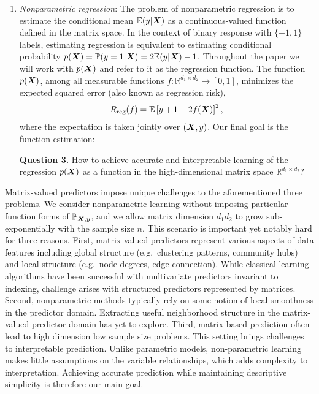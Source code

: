 \documentclass[12pt]{article}
\begin{document}
\begin{enumerate}[label={2.\arabic*},wide, labelwidth=!, labelindent=0pt]
{\bf Question 2.} How to simultaneously estimate the level set and identify important variables in the matrix-valued predictors $\mX$, for the goal of interpretable prediction?


\item {\it Nonparametric regression}: The problem of nonparametric regression is to estimate the conditional mean $\mathbb{E}(y|\bm X)$ as a continuous-valued function defined in the matrix space. In the context of binary response with $\{-1,1\}$ labels, estimating regression is equivalent to estimating conditional probability $p(\bm X)=\mathbb{P}(y=1|\bm X)=2\mathbb{E}(y|\bm X)-1$. Throughout the paper we will work with $p(\bm X)$ and refer to it as the regression function. The function $p(\bm X)$, among all measurable functions $f\colon \mathbb{R}^{d_1\times d_2}\to[0,1]$, minimizes the expected squared error (also known as regression risk),
\begin{equation}\label{eq:regression}
R_{\text{reg}}(f)=\mathbb{E}\left[y+1-2f(\bm X)\right]^2,
\end{equation}
where the expectation is taken jointly over $(\bm X,y)$. Our final goal is the function estimation:

{\bf Question 3.} How to achieve accurate and interpretable learning of the regression $p(\bm X)$ as a function in the high-dimensional matrix space $\mathbb{R}^{d_1\times d_2}$?
\end{enumerate}


Matrix-valued predictors impose unique challenges to the aforementioned three problems. We consider nonparametric learning without imposing particular function forms of $\mathbb{P}_{\bm X,y}$, and we allow matrix dimension $d_1d_2$ to grow sub-exponentially with the sample size $n$. This scenario is important yet notably hard for three reasons. First, matrix-valued predictors represent various aspects of data features including global structure (e.g.\ clustering patterns, community hubs) and local structure (e.g.\ node degrees, edge connection). While classical learning algorithms have been successful with multivariate predictors invariant to indexing, challenge arises with structured predictors represented by matrices. Second, nonparametric methods typically rely on some notion of local smoothness in the predictor domain. Extracting useful neighborhood structure in the matrix-valued predictor domain has yet to explore. Third, matrix-based prediction often lead to high dimension low sample size problems. This setting brings challenges to interpretable prediction. Unlike parametric models, non-parametric learning makes little assumptions on the variable relationships, which adds complexity to interpretation. Achieving accurate prediction while maintaining descriptive simplicity is therefore our main goal. 
\end{document}

